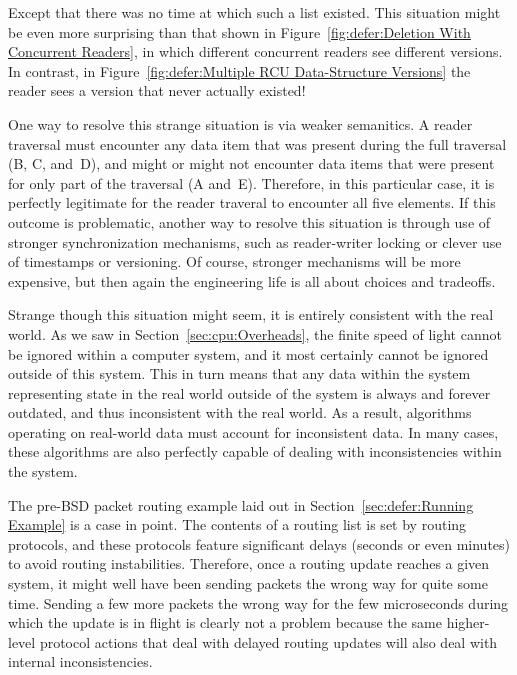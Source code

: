 Except that there was no time at which such a list existed.
This situation might be even more surprising than that shown in
Figure~\ref{fig:defer:Deletion With Concurrent Readers},
in which different concurrent readers see different versions.
In contrast, in
Figure~\ref{fig:defer:Multiple RCU Data-Structure Versions}
the reader sees a version that never actually existed!

One way to resolve this strange situation is via weaker semanitics.
A reader traversal must encounter any data item that was present
during the full traversal (B, C, and~D), and might or might not
encounter data items that were present for only part of the
traversal (A and~E).
Therefore, in this particular case, it is perfectly legitimate for
the reader traveral to encounter all five elements.
If this outcome is problematic, another way to resolve this situation is
through use of stronger synchronization mechanisms, such as reader-writer
locking or clever use of timestamps or versioning.
Of course, stronger mechanisms will be more expensive, but then again
the engineering life is all about choices and tradeoffs.

Strange though this situation might seem, it is entirely consistent with
the real world.
As we saw in
Section~\ref{sec:cpu:Overheads},
the finite speed of light cannot be ignored within a computer system,
and it most certainly cannot be ignored outside of this system.
This in turn means that any data within the system representing state
in the real world outside of the system is always and forever outdated,
and thus inconsistent with the real world.
As a result, algorithms operating on real-world data must account for
inconsistent data.
In many cases, these algorithms are also perfectly capable of dealing
with inconsistencies within the system.

The pre-BSD packet routing example laid out in
Section~\ref{sec:defer:Running Example}
is a case in point.
The contents of a routing list is set by routing protocols, and these
protocols feature significant delays (seconds or even minutes) to avoid
routing instabilities.
Therefore, once a routing update reaches a given system,
it might well have been sending packets the wrong way for quite some time.
Sending a few more packets the wrong way for the few microseconds during
which the update is in flight is clearly not a problem because the same
higher-level protocol actions that deal with delayed routing updates
will also deal with internal inconsistencies.

